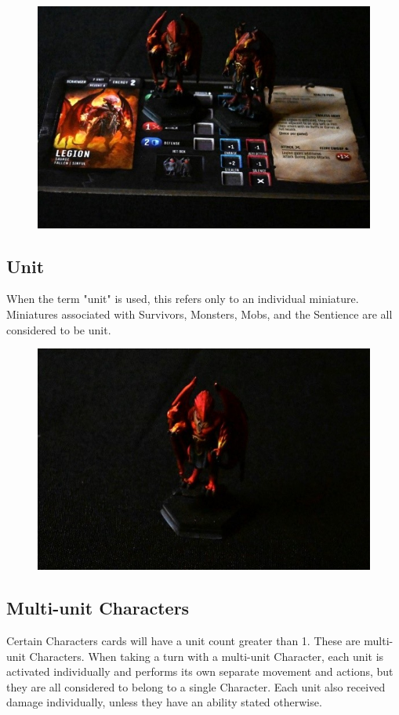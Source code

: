 \documentclass[../main.tex]{subfiles}
\begin{document}
\begin{figure}[h]
    \centering
    \includegraphics[width=1\linewidth]{chapters//Settingupacharactercard/TimeStrikeCharacterwithMini.jpg}
\end{figure}

\subsection{Unit}
When the term "unit" is used, this refers only to an individual miniature. Miniatures associated with Survivors, Monsters, Mobs, and the Sentience are all considered to be unit. 

\begin{figure}[h]
    \centering
    \includegraphics[width=0.75\linewidth]{chapters//Settingupacharactercard/TimeStrikeUnitMiniature.jpg}
\end{figure}

\subsection{Multi-unit Characters}
Certain Characters cards will have a unit count greater than 1. These are multi-unit Characters. When taking a turn with a multi-unit Character, each unit is activated individually and performs its own separate movement and actions, but they are all considered to belong to a single Character. Each unit also received damage individually, unless they have an ability stated otherwise. 
\end{document}
